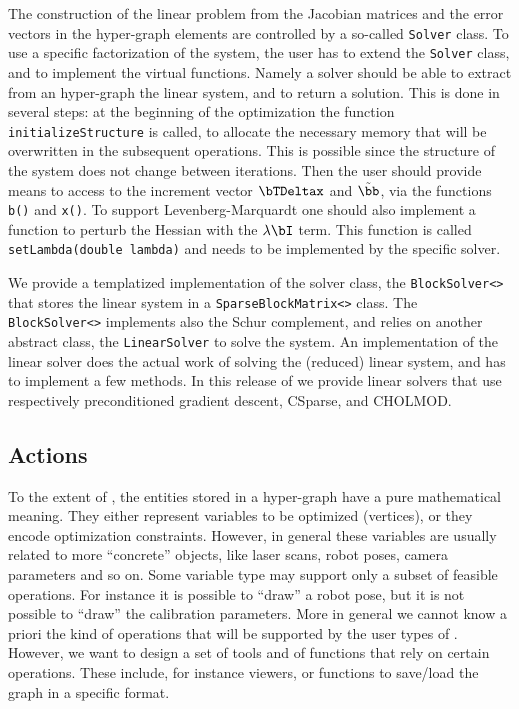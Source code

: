 \documentclass[a4paper]{article}
\begin{document}
The construction of the linear problem from the Jacobian matrices and the error vectors
in the hyper-graph elements are controlled by a so-called \verb+Solver+ class.
To use a specific factorization of the system, the user has to extend the
\verb+Solver+ class, and to implement the virtual functions. 
Namely a solver should be able to extract from an
hyper-graph the linear system, and to return a solution.  This is
done in several steps: at the beginning of the optimization the
function \verb+initializeStructure+ is called, to allocate the
necessary memory that will be overwritten in the subsequent
operations. This is possible since the structure of the system does
not change between iterations. Then the user should provide means to
access to the increment vector $\bTDeltax$ and $\tilde \bb$, via the
functions \verb+b()+ and \verb+x()+. To support Levenberg-Marquardt
one should also implement a function to perturb the Hessian with the
$\lambda \bI$ term. This function is called
\verb+setLambda(double lambda)+ and needs to be implemented by the
specific solver.

We provide a templatized implementation of the solver class, the
\verb+BlockSolver<>+ that stores the linear system in a
\verb+SparseBlockMatrix<>+ class. The \verb+BlockSolver<>+ implements
also the Schur complement, and relies on another abstract class, the
\verb+LinearSolver+ to solve the system.
An implementation of the linear solver does the actual work
of solving the (reduced) linear system, and has to implement a few methods.
In this release of \gopt{} we provide linear solvers that use respectively
preconditioned gradient descent, CSparse, and CHOLMOD.


\subsection{Actions}
To the extent of \gopt{}, the entities stored in a hyper-graph have a
pure mathematical meaning. They either represent variables to be
optimized (vertices), or they encode optimization constraints.
However, in general these variables are usually related to more
``concrete'' objects, like laser scans, robot poses, camera parameters
and so on.  Some variable type may support only a subset of feasible
operations.  For instance it is possible to ``draw'' a robot pose, but
it is not possible to ``draw'' the calibration parameters.  More in
general we cannot know a priori the kind of operations that will be
supported by the user types of \gopt.  However, we want to design a set
of tools and of functions that rely on certain operations. These include,
for instance viewers, or functions to save/load the graph in a specific format.
\end{document}
